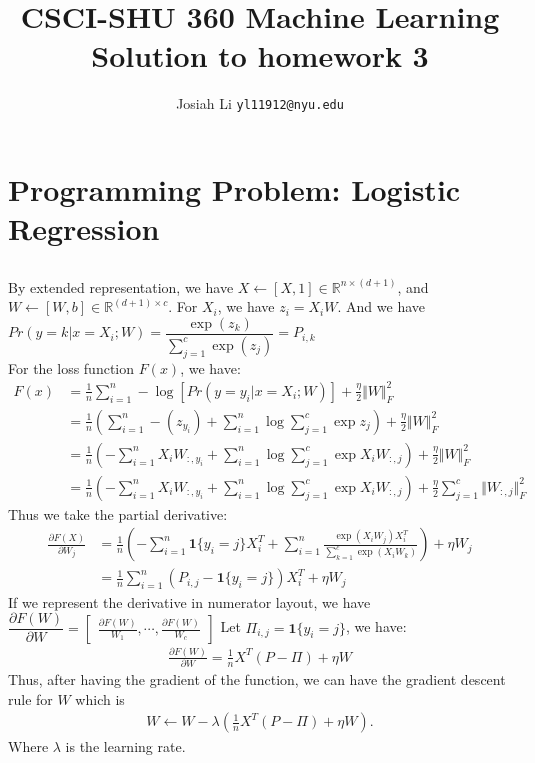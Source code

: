 \documentclass{article}
\title{CSCI-SHU 360 Machine Learning\\
    Solution to homework 3}
\author{Josiah Li \texttt{yl11912@nyu.edu}}
\begin{document}
    \maketitle
\section{Programming Problem: Logistic Regression}
\subsection{}
By extended representation, we have $ X\gets [X,1] \in \mathbb{R}^{n\times (d+1)} $, and $ W\gets [W, b]\in \mathbb{R}^{(d+1)\times c} $. For $X_i$, we have $ z_i=X_iW $. And we have $ Pr(y=k|x=X_i;W) = \dfrac{\exp{(z_k)}}{\sum_{j=1 }^{c } \exp{(z_j)}}  = P_{i,k}$\\ 
For the loss function $ F(x) $, we have: 
\begin{align*}
    F(x) &= \frac{1}{n} \sum_{i=1}^{n} -\log[Pr(y=y_i|x=X_i;W)] + \frac{\eta}{2}\Vert W\Vert ^2_F\\ 
         &= \frac{1}{n} (\sum_{i=1}^{n} -(z_{y_i}) + \sum_{i = 1}^{n}\log{\sum_{j=1 }^{c } \exp{z_j}} )+ \frac{\eta}{2}\Vert W\Vert ^2_F\\ 
         &= \frac{1}{n} (-\sum_{i=1}^{n} X_{i}W_{:,y_i} + \sum_{i=1}^{n} \log \sum_{j=1 }^{c } \exp{X_iW_{:,j}}) + \frac{\eta}{2}\Vert  W\Vert ^2_F\\
         &= \frac{1}{n} (-\sum_{i=1}^{n} X_{i}W_{:,y_i} + \sum_{i=1}^{n} \log \sum_{j=1 }^{c } \exp{X_iW_{:,j}}) + \frac{\eta}{2}\sum_{j=1 }^{c} \Vert  W_{:,j}\Vert ^2_F
\end{align*}
Thus we take the partial derivative:
\begin{align*}
    \frac{\partial F(X)}{\partial W_j} &= \frac{1}{n} (-\sum_{i=1}^{n} \mathbf{1}\{y_i = j\}X_i^T + \sum_{i=1}^{n} \frac{\exp{(X_iW_j)}X_i^T}{\sum_{k=1 }^{c } \exp{(X_iW_k)}}) + \eta W_j\\
                                       &= \frac{1 }{n}\sum_{i=1}^{n}(P_{i,j} - \mathbf{1}\{y_i = j\})X_i^T + \eta W_j
\end{align*}
If we represent the derivative in numerator layout, we have $ \dfrac{\partial F(W)}{\partial W} = \begin{bmatrix}
\frac{\partial F(W)}{W_1},
\cdots,
\frac{\partial F(W)}{W_c}
\end{bmatrix}$
Let $ \Pi_{i,j} = \mathbf{1}\{y_i = j\}  $, we have:\\
\begin{align*}
    \frac{\partial F(W)}{\partial W} = \frac{1}{n} X^T(P - \Pi) + \eta W
\end{align*}
Thus, after having the gradient of the function, we can have the gradient descent rule for $ W $ which is \begin{align*}
    W\gets W - \lambda (\frac{1}{n}X^T(P-\Pi) + \eta W).
\end{align*}
Where $ \lambda  $ is the learning rate.
\end{document}
